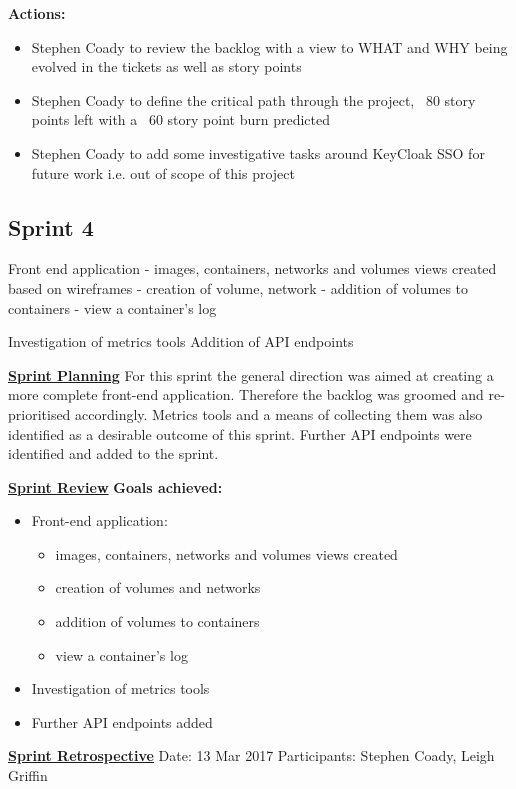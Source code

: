 \textbf{Actions:}
\begin{itemize}
	\item Stephen Coady to review the backlog with a view to WHAT and WHY being evolved in the tickets as well as story points
	\item Stephen Coady to define the critical path through the project, ~80 story points left with a ~60 story point burn predicted
	\item Stephen Coady to add some investigative tasks around KeyCloak SSO for future work i.e. out of scope of this project
\end{itemize}

\subsection{Sprint 4}
Front end application
	- images, containers, networks and volumes views created based on wireframes
	- creation of volume, network
	- addition of volumes to containers
	- view a container's log
	
Investigation of metrics tools
Addition of API endpoints

\underline{\textbf{Sprint Planning}}\newline
For this sprint the general direction was aimed at creating a more complete front-end application. Therefore the backlog was groomed and re-prioritised accordingly. Metrics tools and a means of collecting them was also identified as a desirable outcome of this sprint. Further API endpoints were identified and added to the sprint.

\underline{\textbf{Sprint Review}}\newline
\textbf{Goals achieved:}
\begin{itemize}
	\item Front-end application:
	\begin{itemize}
		\item images, containers, networks and volumes views created
		\item creation of volumes and networks
		\item addition of volumes to containers
		\item view a container's log
	\end{itemize}
	\item Investigation of metrics tools
	\item Further API endpoints added
\end{itemize}

\underline{\textbf{Sprint Retrospective}}\newline
Date: 13 Mar 2017
Participants: Stephen Coady, Leigh Griffin

